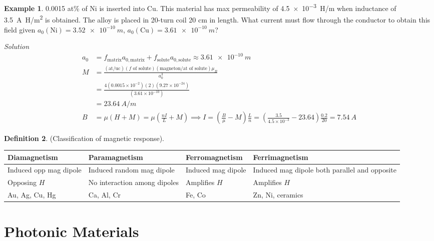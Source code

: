\documentclass{article}
\theoremstyle{definition}
\newtheorem{definition}{Definition}[section]
\newtheorem{example}[definition]{Example}
\begin{document}
\begin{example}
    0.0015 at\% of Ni is inserted into Cu. This material has max permeability of \SI{4.5e-3}{H/m} when inductance of \SI{3.5}{A.H/m^2} is obtained. The alloy is placed in 20-turn coil 20 cm in length. What current must flow through the conductor to obtain this field given $a_0(\text{Ni}) = \SI{3.52e-10}{m}$, $a_0(\text{Cu}) = \SI{3.61e-10}{m}$?

    \textit{Solution}
    \begin{align*}
        a_0 &= f_\text{matrix} a_{0,\text{matrix}} + f_\text{solute} a_{0, \text{solute}} \approx \SI{3.61e-10}{m} \\
        M &= \frac{(\text{at/uc})(f\text{ of solute})(\text{magneton/at of solute}) \mu_B}{a_0^3} \\
        &= \frac{4 (0.0015 \times 10^{-2})(2)(9.27 \times 10^{-24})}{(3.61 \times 10^{-10})} \\
        &= \SI{23.64}{A/m} \\
        B &= \mu (H + M) = \mu (\frac{nI}{L} + M) \implies I = \left( \frac{B}{\mu} - M \right) \frac{L}{n} = \left( \frac{3.5}{4.5\times10^{-3}} - 23.64 \right) \frac{0.2}{20} = \SI{7.54}{A}
    \end{align*}
\end{example}

\begin{definition}
    (Classification of magnetic response).
    \begin{table}[ht]
        \centering
        \begin{tabular}{lp{3.5cm}lp{4cm}}
            \toprule
            Diamagnetism & Paramagnetism & Ferromagnetism & Ferrimagnetism \\
            \midrule
            Induced opp mag dipole & Induced random mag dipole & Induced mag dipole & Induced mag dipole both parallel and opposite \\
            Opposing $H$ & No interaction among dipoles & Amplifies $H$ & Amplifies $H$ \\
            Au, Ag, Cu, Hg & Ca, Al, Cr & Fe, Co & Zn, Ni, ceramics \\
            \bottomrule
        \end{tabular}
    \end{table}
\end{definition}

\newpage

\section{Photonic Materials}
\end{document}
